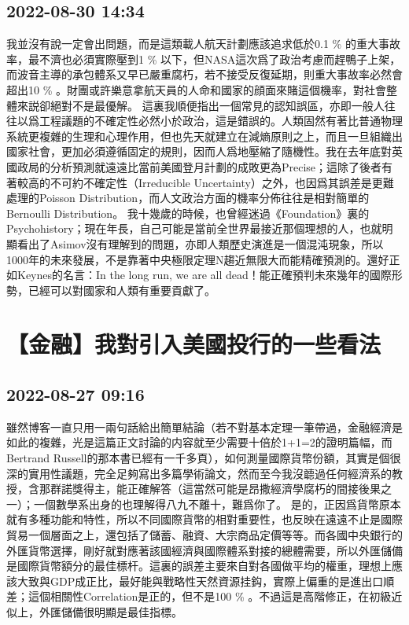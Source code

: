 \documentclass[twocolumn]{ctexart}
\begin{document}
\subsection*{2022-08-30 14:34}

我並沒有說一定會出問題，而是這類載人航天計劃應該追求低於0.1 \% 的重大事故率，最不濟也必須實際壓到1 \% 以下，但NASA這次爲了政治考慮而趕鴨子上架，而波音主導的承包體系又早已嚴重腐朽，若不接受反復延期，則重大事故率必然會超出10 \% 。財團或許樂意拿航天員的人命和國家的顔面來賭這個機率，對社會整體來説卻絕對不是最優解。
這裏我順便指出一個常見的認知誤區，亦即一般人往往以爲工程議題的不確定性必然小於政治，這是錯誤的。人類固然有著比普通物理系統更複雜的生理和心理作用，但也先天就建立在減熵原則之上，而且一旦組織出國家社會，更加必須遵循固定的規則，因而人爲地壓縮了隨機性。我在去年底對英國政局的分析預測就遠遠比當前美國登月計劃的成敗更為Precise；這除了後者有著較高的不可約不確定性（Irreducible Uncertainty）之外，也因爲其誤差是更難處理的Poisson Distribution，而人文政治方面的機率分佈往往是相對簡單的Bernoulli Distribution。
我十幾歲的時候，也曾經迷過《Foundation》裏的Psychohistory；現在年長，自己可能是當前全世界最接近那個理想的人，也就明顯看出了Asimov沒有理解到的問題，亦即人類歷史演進是一個混沌現象，所以1000年的未來發展，不是靠著中央極限定理N趨近無限大而能精確預測的。還好正如Keynes的名言：In the long run, we are all dead！能正確預判未來幾年的國際形勢，已經可以對國家和人類有重要貢獻了。
\section*{【金融】我對引入美國投行的一些看法}
\subsection*{2022-08-27 09:16}

雖然博客一直只用一兩句話給出簡單結論（若不對基本定理一筆帶過，金融經濟是如此的複雜，光是這篇正文討論的内容就至少需要十倍於1+1=2的證明篇幅，而Bertrand Russell的那本書已經有一千多頁），如何測量國際貨幣份額，其實是個很深的實用性議題，完全足夠寫出多篇學術論文，然而至今我沒聼過任何經濟系的教授，含那群諾獎得主，能正確解答（這當然可能是昂撒經濟學腐朽的間接後果之一）；一個數學系出身的也理解得八九不離十，難爲你了。
是的，正因爲貨幣原本就有多種功能和特性，所以不同國際貨幣的相對重要性，也反映在遠遠不止是國際貿易一個層面之上，還包括了儲蓄、融資、大宗商品定價等等。而各國中央銀行的外匯貨幣選擇，剛好就對應著該國經濟與國際體系對接的總體需要，所以外匯儲備是國際貨幣額分的最佳標杆。這裏的誤差主要來自對各國做平均的權重，理想上應該大致與GDP成正比，最好能與戰略性天然資源挂鈎，實際上偏重的是進出口順差；這個相關性Correlation是正的，但不是100 \% 。不過這是高階修正，在初級近似上，外匯儲備很明顯是最佳指標。
\end{document}
